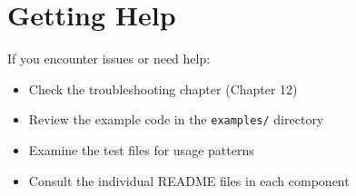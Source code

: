 \section{Getting Help}

If you encounter issues or need help:

\begin{itemize}
    \item Check the troubleshooting chapter (Chapter 12)
    \item Review the example code in the \texttt{examples/} directory
    \item Examine the test files for usage patterns
    \item Consult the individual README files in each component
\end{itemize} 